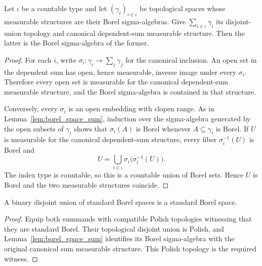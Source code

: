 \begin{lemma}
  \label{lem:borel_space_sigma}
  Let $\iota$ be a countable type and let $(\gamma_i)_{i \in \iota}$ be
  topological spaces whose measurable structures are their Borel
  sigma-algebras.  Give $\sum_{i \in \iota} \gamma_i$ its disjoint-union
  topology and canonical dependent-sum measurable structure.  Then the latter
  is the Borel sigma-algebra of the former.
\end{lemma}

\begin{proof}

\leanok
  For each $i$, write $\sigma_i : \gamma_i \to \sum_j \gamma_j$ for the
  canonical inclusion.  An open set in the dependent sum has open, hence
  measurable, inverse image under every $\sigma_i$.  Therefore every open set
  is measurable for the canonical dependent-sum measurable structure, and the
  Borel sigma-algebra is contained in that structure.

  Conversely, every $\sigma_i$ is an open embedding with clopen range.  As in
  Lemma~\ref{lem:borel_space_sum}, induction over the sigma-algebra generated
  by the open subsets of $\gamma_i$ shows that $\sigma_i(A)$ is Borel whenever
  $A \subseteq \gamma_i$ is Borel.  If $U$ is measurable for the canonical
  dependent-sum structure, every fiber $\sigma_i^{-1}(U)$ is Borel and
  \[
    U = \bigcup_{i \in \iota}
      \sigma_i\bigl(\sigma_i^{-1}(U)\bigr).
  \]
  The index type is countable, so this is a countable union of Borel sets.
  Hence $U$ is Borel and the two measurable structures coincide.
\end{proof}

\begin{lemma}
  \label{lem:standard_borel_space_sum}
  A binary disjoint union of standard Borel spaces is a standard Borel space.
\end{lemma}

\begin{proof}

\leanok
  Equip both summands with compatible Polish topologies witnessing that they
  are standard Borel.  Their topological disjoint union is Polish, and
  Lemma~\ref{lem:borel_space_sum} identifies its Borel sigma-algebra with the
  original canonical sum measurable structure.  This Polish topology is the
  required witness.
\end{proof}

